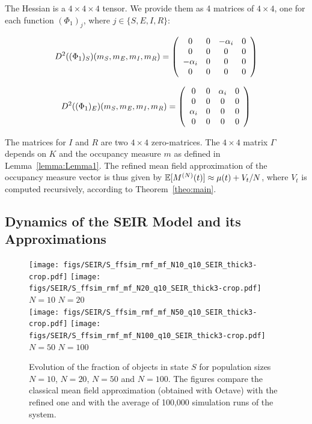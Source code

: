 \documentclass[review]{elsarticle}
\begin{document}
The Hessian is a $4 \times 4 \times 4$ tensor. We provide them as 4 matrices of $4 \times 4$, one for each function $(\Phi_1)_j$, where $j \in \{S,E,I,R\}$:

$$D^2((\Phi_1)_S)(m_{\mathit{S}}, m_{\mathit{E}},m_{\mathit{I}},m_{\mathit{R}})
= \left(
    \begin{array}{cccc}
      0 &  0& -\alpha_i & 0  \\
      0 & 0 & 0 & 0 \\
      -\alpha_i & 0 & 0 & 0 \\
      0 & 0 & 0 & 0 \\
    \end{array}
  \right)$$
  
$$D^2((\Phi_1)_E)(m_{\mathit{S}}, m_{\mathit{E}},m_{\mathit{I}},m_{\mathit{R}})
= \left(
    \begin{array}{cccc}
      0 &  0& \alpha_i & 0  \\
      0 & 0 & 0 & 0 \\
      \alpha_i & 0 & 0 & 0 \\
      0 & 0 & 0 & 0 \\
    \end{array}
  \right)$$
  
The matrices for $I$ and $R$ are two $4 \times 4$ zero-matrices.
%
The $4 \times 4$ matrix $\Gamma$ depends on $K$ and the occupancy measure $m$ as defined in Lemma~\ref{lemma:Lemma1}.
%
The refined mean field approximation of the occupancy measure vector is thus given by 
$\mathbb{E}[M^{(N)}(t)] \approx \mu(t) + V_t/N$, where $V_t$ is computed recursively, according to Theorem~\ref{theo:main}.

\subsection{Dynamics of the SEIR Model and its Approximations}


\begin{figure}[ht]
\begin{center}
  \texttt{[image: figs/SEIR/S\_ffsim\_rmf\_mf\_N10\_q10\_SEIR\_thick3-crop.pdf]}
  \texttt{[image: figs/SEIR/S\_ffsim\_rmf\_mf\_N20\_q10\_SEIR\_thick3-crop.pdf]}\\
  $                 N=10$ \hspace{2in} $N=20$\\[1em]
  \texttt{[image: figs/SEIR/S\_ffsim\_rmf\_mf\_N50\_q10\_SEIR\_thick3-crop.pdf]}
  \texttt{[image: figs/SEIR/S\_ffsim\_rmf\_mf\_N100\_q10\_SEIR\_thick3-crop.pdf]}\\
  $                 N=50$ \hspace{2in} $N=100$\\[1em]
\end{center}
\caption{\label{fig:res} Evolution of the fraction of objects in state $S$ for population sizes $N=10$, $N=20$, $N=50$ and $N=100$. The figures compare the classical mean field approximation (obtained with Octave) with the refined one and with the average of 100,000 simulation runs of the system. 
}
\end{figure}
\end{document}
